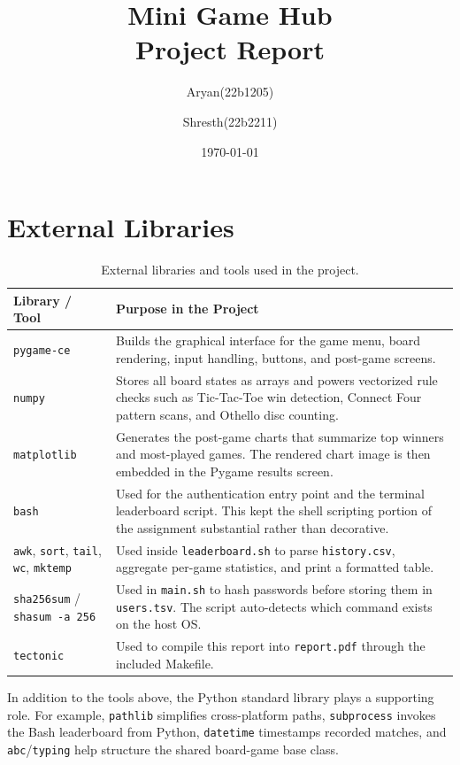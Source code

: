 \documentclass[12pt,a4paper]{article}
\title{\textbf{Mini Game Hub} \\ \large Project Report}
\author{Aryan(22b1205) \and Shresth(22b2211)}
\date{\today}
\begin{document}
\maketitle
\tableofcontents
\newpage

\section{External Libraries}

\begin{table}[H]
\centering
\begin{tabularx}{\textwidth}{@{}lX@{}}
\toprule
\textbf{Library / Tool} & \textbf{Purpose in the Project} \\
\midrule
\texttt{pygame-ce} & Builds the graphical interface for the game menu, board rendering, input handling, buttons, and post-game screens. \\
\texttt{numpy} & Stores all board states as arrays and powers vectorized rule checks such as Tic-Tac-Toe win detection, Connect Four pattern scans, and Othello disc counting. \\
\texttt{matplotlib} & Generates the post-game charts that summarize top winners and most-played games. The rendered chart image is then embedded in the Pygame results screen. \\
\texttt{bash} & Used for the authentication entry point and the terminal leaderboard script. This kept the shell scripting portion of the assignment substantial rather than decorative. \\
\texttt{awk}, \texttt{sort}, \texttt{tail}, \texttt{wc}, \texttt{mktemp} & Used inside \texttt{leaderboard.sh} to parse \texttt{history.csv}, aggregate per-game statistics, and print a formatted table. \\
\texttt{sha256sum} / \texttt{shasum -a 256} & Used in \texttt{main.sh} to hash passwords before storing them in \texttt{users.tsv}. The script auto-detects which command exists on the host OS. \\
\texttt{tectonic} & Used to compile this report into \texttt{report.pdf} through the included Makefile. \\
\bottomrule
\end{tabularx}
\caption{External libraries and tools used in the project.}
\end{table}

In addition to the tools above, the Python standard library plays a supporting role. For example, \texttt{pathlib} simplifies cross-platform paths, \texttt{subprocess} invokes the Bash leaderboard from Python, \texttt{datetime} timestamps recorded matches, and \texttt{abc}/\texttt{typing} help structure the shared board-game base class.
\end{document}
